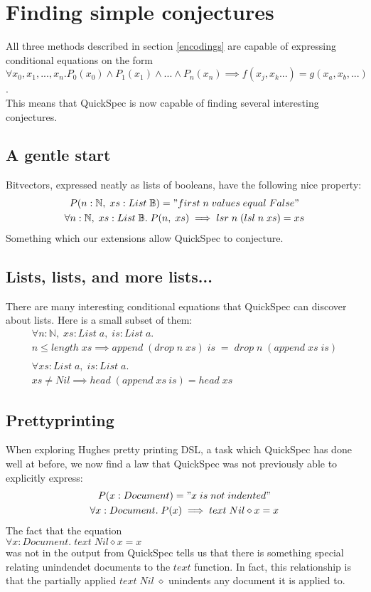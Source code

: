 \section{Finding simple conjectures}
All three methods described in section \ref{encodings}
are capable of expressing conditional equations on the form
\\$\forall x_0, x_1, ..., x_n. P_0(x_0) \wedge P_1(x_1) \wedge ... \wedge P_n(x_n) \implies f(x_j, x_k ...) = g(x_a, x_b, ...)$.\\
This means that QuickSpec is now capable of finding several
interesting conjectures.

\subsection{A gentle start} \label{bitvector}
Bitvectors, expressed neatly as lists of booleans,
have the following nice property:
\begin{gather*}
    P(n:\mathbb{N},\;xs:List\;\mathbb{B}) = "first\;n\;values\;equal\;False"\\
    \forall n:\mathbb{N},\;xs:List\;\mathbb{B}.\;P(n,\;xs)\implies lsr\;n\;(lsl\;n\;xs)=xs
\end{gather*}
Something which our extensions allow QuickSpec to conjecture.

\subsection{Lists, lists, and more lists...}
There are many interesting conditional equations that
QuickSpec can discover about lists. Here is a small subset of them:
\begin{gather*}
    \forall n:\mathbb{N},\; xs:List\; a,\; is:List\; a.\\ n \leq length\; xs \implies append\; (drop\; n\; xs)\; is\; =\; drop\; n\; (append\; xs\; is)\\\\
    \forall xs:List\; a,\; is:List\; a.\\ xs \neq Nil \implies head\; (append\; xs\: is) = head\; xs
\end{gather*}

\subsection{Prettyprinting}
When exploring Hughes pretty printing DSL, %
a task which QuickSpec has done well at before, we now find a law that QuickSpec
was not previously able to explicitly express:
\begin{gather*}
    P(x:Document) = "x\; is\; not\; indented"\\
    \forall x:Document.\; P(x)\implies text\;Nil\diamond x=x
\end{gather*}
The fact that the equation\\
$\forall x:Document.\; text\;Nil\diamond x = x$\\
was not in the output from QuickSpec tells us that there is something special
relating unindendet documents to the $text$ function. In fact, this relationship
is that the partially applied $text\;Nil\;\diamond$ unindents any document it is applied to. 


